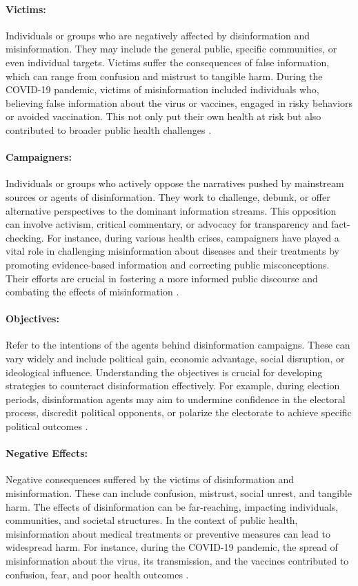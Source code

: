 \documentclass{Configuration_Files/PoliMi3i_thesis}
\begin{document}
\paragraph{Victims:} Individuals or groups who are negatively affected by disinformation and misinformation. They may include the general public, specific communities, or even individual targets. Victims suffer the consequences of false information, which can range from confusion and mistrust to tangible harm. During the COVID-19 pandemic, victims of misinformation included individuals who, believing false information about the virus or vaccines, engaged in risky behaviors or avoided vaccination. This not only put their own health at risk but also contributed to broader public health challenges \cite{brennen2020types, vosoughi2018spread}.

\paragraph{Campaigners:} Individuals or groups who actively oppose the narratives pushed by mainstream sources or agents of disinformation. They work to challenge, debunk, or offer alternative perspectives to the dominant information streams. This opposition can involve activism, critical commentary, or advocacy for transparency and fact-checking. For instance, during various health crises, campaigners have played a vital role in challenging misinformation about diseases and their treatments by promoting evidence-based information and correcting public misconceptions. Their efforts are crucial in fostering a more informed public discourse and combating the effects of misinformation \cite{bevendorff:2024}.

\paragraph{Objectives:} Refer to the intentions of the agents behind disinformation campaigns. These can vary widely and include political gain, economic advantage, social disruption, or ideological influence. Understanding the objectives is crucial for developing strategies to counteract disinformation effectively. For example, during election periods, disinformation agents may aim to undermine confidence in the electoral process, discredit political opponents, or polarize the electorate to achieve specific political outcomes \cite{allcott2017, lazer2018science}.

\paragraph{Negative Effects:} Negative consequences suffered by the victims of disinformation and misinformation. These can include confusion, mistrust, social unrest, and tangible harm. The effects of disinformation can be far-reaching, impacting individuals, communities, and societal structures. In the context of public health, misinformation about medical treatments or preventive measures can lead to widespread harm. For instance, during the COVID-19 pandemic, the spread of misinformation about the virus, its transmission, and the vaccines contributed to confusion, fear, and poor health outcomes \cite{bursztyn2020misinformation}.
\end{document}
